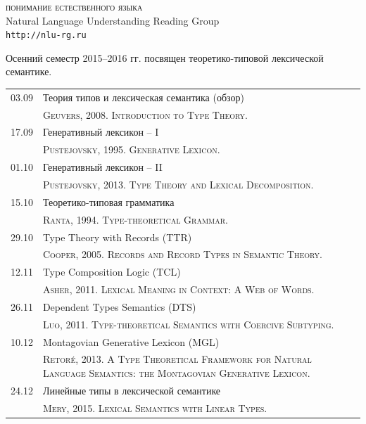 \documentclass[12pt]{article}
\begin{document}

\parindent 0mm


\begin{center}
{\rm \Huge \textsc{понимание естественного языка}}\\
\bigskip
{\rm \Large Natural Language Understanding Reading Group}\\
\bigskip
{\rm \Large \texttt{http://nlu-rg.ru}}
\end{center}

\bigskip
\medskip

\begin{spacing}{1.2}
\hfill
\parbox{0.986\textwidth}{
Осенний семестр 2015--2016 гг. посвящен теоретико-типовой лексической семантике.
}
\end{spacing}

\medskip

\begin{table}[h!]
\begin{tabularx}{\textwidth}{cX}
03.09 & Теория типов и лексическая семантика (обзор) \bigstrut[t] \\
      & {\scriptsize \textsc{Geuvers, 2008. Introduction to Type Theory.}} \bigstrut[b] \\
17.09 & Генеративный лексикон -- I \bigstrut[t] \\
      & {\scriptsize \textsc{Pustejovsky, 1995. Generative Lexicon.}} \bigstrut[b] \\
01.10 & Генеративный лексикон -- II \bigstrut[t] \\
      & {\scriptsize \textsc{Pustejovsky, 2013. Type Theory and Lexical Decomposition.}} \bigstrut[b] \\
15.10 & Теоретико-типовая грамматика \bigstrut[t] \\
      & {\scriptsize \textsc{Ranta, 1994. Type-theoretical Grammar.}} \bigstrut[b] \\
29.10 & Type Theory with Records (TTR) \bigstrut[t] \\
      & {\scriptsize \textsc{Cooper, 2005. Records and Record Types in Semantic Theory.}} \bigstrut[b] \\
12.11 & Type Composition Logic (TCL)  \bigstrut[t] \\
      & {\scriptsize \textsc{Asher, 2011. Lexical Meaning in Context: A Web of Words.}} \bigstrut[b] \\
26.11 & Dependent Types Semantics (DTS)  \bigstrut[t] \\
      & {\scriptsize \textsc{Luo, 2011. Type-theoretical Semantics with Coercive Subtyping.}} \bigstrut[b] \\
10.12 & Montagovian Generative Lexicon (MGL) \bigstrut[t] \\ 
      & {\scriptsize \textsc{Retor\'{e}, 2013. A Type Theoretical Framework for Natural Language Semantics: the Montagovian Generative Lexicon.}} \bigstrut[b] \\ 
24.12 & Линейные типы в лексической семантике \bigstrut[t] \\
      & {\scriptsize \textsc{Mery, 2015. Lexical Semantics with Linear Types.}} \bigstrut[b] \\      
\end{tabularx}
\end{table}
\end{document}
